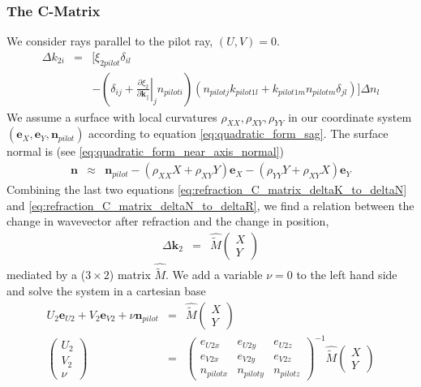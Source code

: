 \documentclass[12pt,a4paper,twoside,openright,BCOR10mm,headsepline,titlepage,abstracton,chapterprefix,final]{scrreprt}
\newcommand\Vector[1]{{\mathbf{#1}}}
\newcommand\wavenumber{k}
\newcommand\Wavevector{\Vector{\wavenumber}}
\begin{document}
\subsubsection{The C-Matrix}
We consider rays parallel to the pilot ray, $(U,V) = 0$.
\begin{eqnarray}
 \Delta \wavenumber_{2i} &=& 
 \Bigg[
     \xi_{2 pilot} \delta_{il} \nonumber\\
 &&- 
     \left( 
       \delta_{ij}
       + \left. \frac{\partial \xi_2}{\partial \Wavevector_{\parallel}} \right|_j n_{pilot i}
     \right) 
     ( n_{pilot j} \wavenumber_{pilot1 l} + \wavenumber_{pilot1 m}   n_{pilot m} \delta_{jl}) 
   \Bigg] \Delta n_l
   \label{eq:refraction_C_matrix_deltaK_to_deltaN}
\end{eqnarray}
We assume a surface with local curvatures $\rho_{XX}, \rho_{XY}, \rho_{YY}$ in our coordinate system
$(\Vector{e}_X, \Vector{e}_Y, \Vector{n}_{pilot})$ according to equation \eqref{eq:quadratic_form_sag}.
The surface normal is (see \eqref{eq:quadratic_form_near_axis_normal})
\begin{eqnarray}
 \Vector{n} &\approx& 
 \Vector{n}_{pilot}
 - (\rho_{XX} X + \rho_{XY} Y) \Vector{e}_X
 - (\rho_{YY} Y + \rho_{XY} X) \Vector{e}_Y
 \label{eq:refraction_C_matrix_deltaN_to_deltaR}
\end{eqnarray}
Combining the last two equations \eqref{eq:refraction_C_matrix_deltaK_to_deltaN} and \eqref{eq:refraction_C_matrix_deltaN_to_deltaR},
we find a relation between the change in wavevector after refraction and the change in position,
\begin{eqnarray}
 \Delta \Wavevector_2 &=& 
 \hat{\tilde{M}}
 \begin{pmatrix}
  X \\ Y
 \end{pmatrix}
\end{eqnarray}
mediated by a ($3\times2$) matrix $\hat{\tilde{M}}$.
We add a variable $\nu=0$ to the left hand side and solve the system in a cartesian base
\begin{eqnarray}
   U_2 \Vector{e}_{U2}
 + V_2 \Vector{e}_{V2}
 + \nu \Vector{n}_{pilot}
 &=& 
 \hat{\tilde{M}}
 \begin{pmatrix}
  X \\ Y
 \end{pmatrix}
 \\
 \begin{pmatrix}
  U_2 \\ V_2 \\ \nu
 \end{pmatrix}
 &=&
 \begin{pmatrix}
  e_{U2x} & e_{U2y} & e_{U2z} \\
  e_{V2x} & e_{V2y} & e_{V2z} \\
  n_{pilot x} & n_{pilot y} & n_{pilot z}
 \end{pmatrix}^{-1}
 \hat{\tilde{M}}
 \begin{pmatrix}
  X \\ Y
 \end{pmatrix}
\end{eqnarray}
\end{document}
